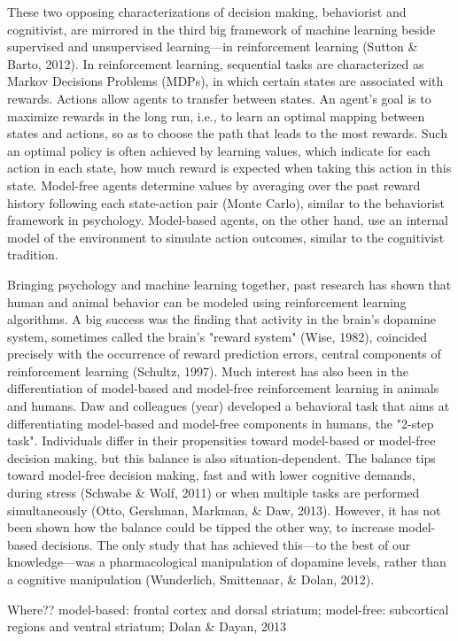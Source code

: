 \documentclass[11pt]{article} %
\begin{document}
These two opposing characterizations of decision making, behaviorist and cognitivist, are mirrored in the third big framework of machine learning beside supervised and unsupervised learning---in reinforcement learning (Sutton \& Barto, 2012). In reinforcement learning, sequential tasks are characterized as Markov Decisions Problems (MDPs), in which certain states are associated with rewards. Actions allow agents to transfer between states. An agent's goal is to maximize rewards in the long run, i.e., to learn an optimal mapping between states and actions, so as to choose the path that leads to the most rewards. Such an optimal policy is often achieved by learning values, which indicate for each action in each state, how much reward is expected when taking this action in this state. Model-free agents determine values by averaging over the past reward history following each state-action pair (Monte Carlo), similar to the behaviorist framework in psychology. Model-based agents, on the other hand, use an internal model of the environment to simulate action outcomes, similar to the cognitivist tradition.

Bringing psychology and machine learning together, past research has shown that human and animal behavior can be modeled using reinforcement learning algorithms. A big success was the finding that activity in the brain's dopamine system, sometimes called the brain's "reward system" (Wise, 1982), coincided precisely with the occurrence of reward prediction errors, central components of reinforcement learning (Schultz, 1997). Much interest has also been in the differentiation of model-based and model-free reinforcement learning in animals and humans. Daw and colleagues (year) developed a behavioral task that aims at differentiating model-based and model-free components in humans, the "2-step task". Individuals differ in their propensities toward model-based or model-free decision making, but this balance is also situation-dependent. The balance tips toward model-free decision making, fast and with lower cognitive demands, during stress (Schwabe \& Wolf, 2011) or when multiple tasks are performed simultaneously (Otto, Gershman, Markman, \& Daw, 2013). However, it has not been shown how the balance could be tipped the other way, to increase model-based decisions. The only study that has achieved this---to the best of our knowledge---was a pharmacological manipulation of dopamine levels, rather than a cognitive manipulation (Wunderlich, Smittenaar, \& Dolan, 2012).

Where?? model-based: frontal cortex and dorsal striatum; model-free: subcortical regions and ventral striatum; Dolan \& Dayan, 2013
\end{document}
